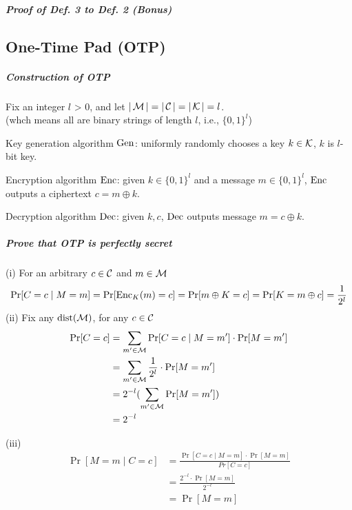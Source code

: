 \subparagraph{Proof of Def. 3 to Def. 2 (Bonus)}



\subsection{One-Time Pad (OTP)}

\subparagraph{Construction of OTP} \label{def:OTP}

Fix an integer \(l\) > 0, and let \(|\operatorname{\mathcal{M}}| = |\operatorname{\mathcal{C}}| = |\operatorname{\mathcal{K}}| = l\). \\
(whch means all are binary strings of length \(l\), i.e., \(\{0, 1\}^l\))

Key generation algorithm \(\operatorname{Gen}\): uniformly randomly chooses a key \(k \in \operatorname{\mathcal{K}}\), \(k\) is \(l\)-bit key.

Encryption algorithm \(\operatorname{Enc}\): given \(k \in \{0, 1\}^l\) and a message \(m \in \{0, 1\}^l\), \(\operatorname{Enc}\) outputs a ciphertext \(c = m \oplus k\).

Decryption algorithm \(\operatorname{Dec}\): given \(k, c\), \(\operatorname{Dec}\) outputs message \(m = c \oplus k\).

\subparagraph{Prove that OTP is perfectly secret}

\begin{myProof}
	(i) For an arbitrary \(c \in \operatorname{\mathcal{C}}\) and \(m \in \operatorname{\mathcal{M}}\) \\
	\[ \Pr[C = c \mid M = m] = \Pr[\operatorname{Enc}_K(m) = c] = \Pr[m \oplus K = c] = \Pr[K = m \oplus c] = \frac{1}{2^l}\]
	(ii) Fix any \(\operatorname{dist}(\operatorname{\mathcal{M}})\), for any \(c \in \operatorname{\mathcal{C}}\)
	\begin{align*}
		\Pr [C = c] &= \sum_{m' \in \operatorname{\mathcal{M}}} \Pr[C = c \mid M = m'] \cdot \Pr[M = m'] \\
		&= \sum_{m' \in \operatorname{\mathcal{M}}} \frac{1}{2^l} \cdot \Pr[M = m'] \\
		&= 2^{-l} (\sum_{m' \in \operatorname{\mathcal{M}}} \Pr[M = m']) \\
		&= 2^{-l}
	\end{align*}
	
	(iii)
	\begin{align*}
		\Pr[M = m \mid C = c] &= \frac{\Pr[C = c \mid M = m] \cdot \Pr[M = m]}{Pr[C = c]} \\
		&= \frac{2^{-l} \cdot \Pr[M = m]}{2^{-l}} \\
		&= \Pr[M = m]
	\end{align*}
\end{myProof}

